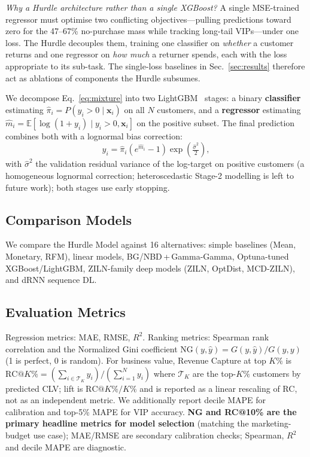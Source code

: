 \documentclass[pdflatex,sn-mathphys-num]{sn-jnl}
\theoremstyle{thmstyleone}
\theoremstyle{thmstyletwo}
\theoremstyle{thmstylethree}
\begin{document}
\textit{Why a Hurdle architecture rather than a single XGBoost?}
A single MSE-trained regressor must optimise two conflicting
objectives---pulling predictions toward zero for the 47--67\%
no-purchase mass while tracking long-tail VIPs---under one loss.
The Hurdle decouples them, training one classifier on
\emph{whether} a customer returns and one regressor on
\emph{how much} a returner spends, each with the loss appropriate
to its sub-task. The single-loss baselines in Sec.~\ref{sec:results}
therefore act as ablations of components the Hurdle subsumes.

We decompose Eq.~\eqref{eq:mixture} into two LightGBM~\cite{ke2017lightgbm}
stages: a binary \textbf{classifier} estimating
$\hat{\pi}_i = P(y_i{>}0\mid\mathbf{x}_i)$ on all $N$ customers, and a
\textbf{regressor} estimating
$\hat{m}_i = \mathbb{E}[\log(1{+}y_i)\mid y_i{>}0,\mathbf{x}_i]$ on the
positive subset. The final prediction combines both with a lognormal
bias correction:
\begin{equation}
\hat{y}_i = \hat{\pi}_i \left(e^{\hat{m}_i} - 1\right)
             \exp\!\left(\tfrac{\hat{\sigma}^2}{2}\right),
\label{eq:hurdle}
\end{equation}
with $\hat\sigma^2$ the validation residual variance of the log-target on
positive customers (a homogeneous lognormal correction; heteroscedastic
Stage-2 modelling is left to future work); both stages use early stopping.

\subsection{Comparison Models}

We compare the Hurdle Model against 16 alternatives: simple baselines
(Mean, Monetary, RFM), linear models, BG/NBD\,+\,Gamma-Gamma,
Optuna-tuned XGBoost/LightGBM, ZILN-family deep models (ZILN, OptDist,
MCD-ZILN), and dRNN sequence DL.

\subsection{Evaluation Metrics}

Regression metrics: MAE, RMSE, $R^2$. Ranking metrics: Spearman rank
correlation and the Normalized Gini coefficient
$\mathrm{NG}(y,\hat y) = G(y,\hat y)/G(y,y)$~\cite{wang2019deep} (1 is
perfect, 0 is random). For business value, Revenue Capture at top
$K\%$ is
$\mathrm{RC}@K\% = (\sum_{i\in\mathcal T_K} y_i)/(\sum_{i=1}^N y_i)$
where $\mathcal T_K$ are the top-$K\%$ customers by predicted CLV;
lift is $\mathrm{RC}@K\%/K\%$ and is reported as a linear rescaling
of RC, not as an independent metric. We additionally report decile
MAPE for calibration and top-5\% MAPE for VIP accuracy.
\textbf{NG and RC@10\% are the primary headline metrics for model
selection} (matching the marketing-budget use case); MAE/RMSE are
secondary calibration checks; Spearman, $R^2$ and decile MAPE are
diagnostic.
\end{document}
